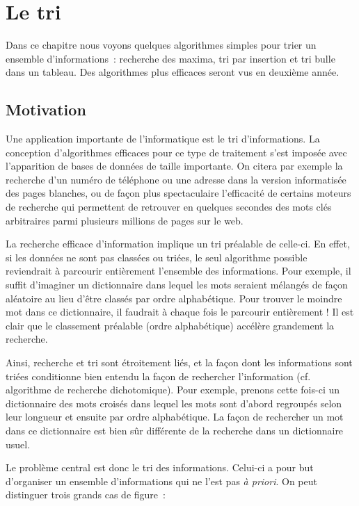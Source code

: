 \chapter{Le tri}

		Dans ce chapitre nous voyons quelques algorithmes simples pour trier un
		ensemble d'informations~: recherche des maxima, tri
		par insertion et tri bulle dans un tableau. 
		Des algorithmes plus efficaces seront vus
		en deuxième année.


\section{Motivation}

	Une application importante de l’informatique est le tri d’informations.
	La conception d’algorithmes efficaces pour ce type de traitement s’est
	imposée avec l’apparition de bases de données de taille importante. On
	citera par exemple la recherche d’un numéro de téléphone ou une adresse
	dans la version informatisée des pages blanches, ou de façon plus
	spectaculaire l’efficacité de certains moteurs de recherche qui
	permettent de retrouver en quelques secondes des mots clés arbitraires
	parmi plusieurs millions de pages sur le web.


	La recherche efficace d’information implique un tri préalable de
	celle-ci. En effet, si les données ne sont pas classées ou triées, le
	seul algorithme possible reviendrait à parcourir entièrement l’ensemble
	des informations. Pour exemple, il suffit d’imaginer un dictionnaire
	dans lequel les mots seraient mélangés de façon aléatoire au lieu
	d’être classés par ordre alphabétique. Pour trouver le moindre mot dans
	ce dictionnaire, il faudrait à chaque fois le parcourir entièrement !
	Il est clair que le classement préalable (ordre alphabétique) accélère
	grandement la recherche.


	Ainsi, recherche et tri sont étroitement liés, et la façon dont les
	informations sont triées conditionne bien entendu la façon de
	rechercher l’information (cf. algorithme de recherche dichotomique).
	Pour exemple, prenons cette fois-ci un dictionnaire des mots croisés
	dans lequel les mots sont d’abord regroupés selon leur longueur et
	ensuite par ordre alphabétique. La façon de rechercher un mot dans ce
	dictionnaire est bien sûr différente de la recherche dans un
	dictionnaire usuel. 

	Le problème central est donc le tri des informations. Celui-ci a pour
	but d’organiser un ensemble d’informations qui ne l’est pas \textit{à
	priori}. On peut distinguer trois grands cas de figure~:

